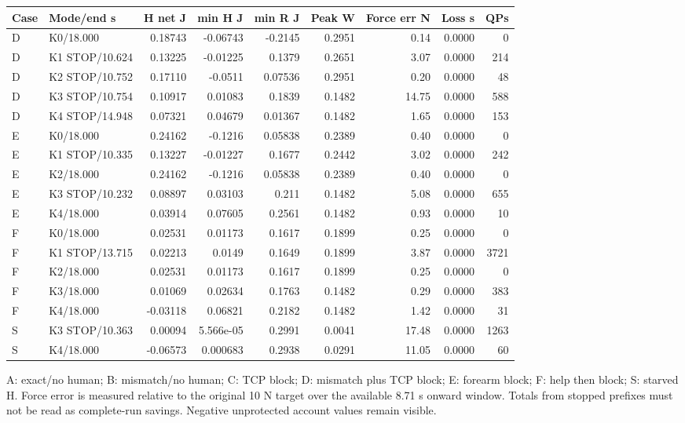 \documentclass[10pt,letterpaper]{article}
\begin{document}
\begingroup\small\setlength{\tabcolsep}{3pt}\begin{center}\begin{tabular}{llrrrrrrr}\toprule Case & Mode/end s & H net J & min H J & min R J & Peak W & Force err N & Loss s & QPs\\\midrule
D & K0/18.000 & 0.18743 & -0.06743 & -0.2145 & 0.2951 & 0.14 & 0.0000 & 0 \\
D & K1 STOP/10.624 & 0.13225 & -0.01225 & 0.1379 & 0.2651 & 3.07 & 0.0000 & 214 \\
D & K2 STOP/10.752 & 0.17110 & -0.0511 & 0.07536 & 0.2951 & 0.20 & 0.0000 & 48 \\
D & K3 STOP/10.754 & 0.10917 & 0.01083 & 0.1839 & 0.1482 & 14.75 & 0.0000 & 588 \\
D & K4 STOP/14.948 & 0.07321 & 0.04679 & 0.01367 & 0.1482 & 1.65 & 0.0000 & 153 \\
E & K0/18.000 & 0.24162 & -0.1216 & 0.05838 & 0.2389 & 0.40 & 0.0000 & 0 \\
E & K1 STOP/10.335 & 0.13227 & -0.01227 & 0.1677 & 0.2442 & 3.02 & 0.0000 & 242 \\
E & K2/18.000 & 0.24162 & -0.1216 & 0.05838 & 0.2389 & 0.40 & 0.0000 & 0 \\
E & K3 STOP/10.232 & 0.08897 & 0.03103 & 0.211 & 0.1482 & 5.08 & 0.0000 & 655 \\
E & K4/18.000 & 0.03914 & 0.07605 & 0.2561 & 0.1482 & 0.93 & 0.0000 & 10 \\
F & K0/18.000 & 0.02531 & 0.01173 & 0.1617 & 0.1899 & 0.25 & 0.0000 & 0 \\
F & K1 STOP/13.715 & 0.02213 & 0.0149 & 0.1649 & 0.1899 & 3.87 & 0.0000 & 3721 \\
F & K2/18.000 & 0.02531 & 0.01173 & 0.1617 & 0.1899 & 0.25 & 0.0000 & 0 \\
F & K3/18.000 & 0.01069 & 0.02634 & 0.1763 & 0.1482 & 0.29 & 0.0000 & 383 \\
F & K4/18.000 & -0.03118 & 0.06821 & 0.2182 & 0.1482 & 1.42 & 0.0000 & 31 \\
S & K3 STOP/10.363 & 0.00094 & 5.566e-05 & 0.2991 & 0.0041 & 17.48 & 0.0000 & 1263 \\
S & K4/18.000 & -0.06573 & 0.000683 & 0.2938 & 0.0291 & 11.05 & 0.0000 & 60 \\
\bottomrule\end{tabular}\end{center}\endgroup\par
A: exact/no human; B: mismatch/no human; C: TCP block; D: mismatch plus TCP block; E: forearm block; F: help then block; S: starved H. Force error is measured relative to the original 10 N target over the available 8.71 s onward window. Totals from stopped prefixes must not be read as complete-run savings. Negative unprotected account values remain visible.\par
\end{document}
